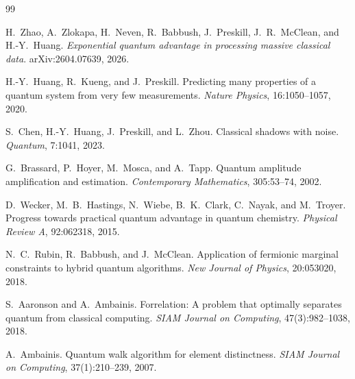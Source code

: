 \documentclass[11pt]{article}
\begin{document}

\begin{thebibliography}{99}

 H.\ Zhao, A.\ Zlokapa, H.\ Neven, R.\ Babbush, J.\ Preskill, J.\ R.\ McClean, and H.-Y.\ Huang. \emph{Exponential quantum advantage in processing massive classical data}. arXiv:2604.07639, 2026.

 H.-Y.\ Huang, R.\ Kueng, and J.\ Preskill. Predicting many properties of a quantum system from very few measurements. \emph{Nature Physics}, 16:1050--1057, 2020.

 S.\ Chen, H.-Y.\ Huang, J.\ Preskill, and L.\ Zhou. Classical shadows with noise. \emph{Quantum}, 7:1041, 2023.

 G.\ Brassard, P.\ Hoyer, M.\ Mosca, and A.\ Tapp. Quantum amplitude amplification and estimation. \emph{Contemporary Mathematics}, 305:53--74, 2002.

 D.\ Wecker, M.\ B.\ Hastings, N.\ Wiebe, B.\ K.\ Clark, C.\ Nayak, and M.\ Troyer. Progress towards practical quantum advantage in quantum chemistry. \emph{Physical Review A}, 92:062318, 2015.

 N.\ C.\ Rubin, R.\ Babbush, and J.\ McClean. Application of fermionic marginal constraints to hybrid quantum algorithms. \emph{New Journal of Physics}, 20:053020, 2018.

 S.\ Aaronson and A.\ Ambainis. Forrelation: A problem that optimally separates quantum from classical computing. \emph{SIAM Journal on Computing}, 47(3):982--1038, 2018.

 A.\ Ambainis. Quantum walk algorithm for element distinctness. \emph{SIAM Journal on Computing}, 37(1):210--239, 2007.

\end{thebibliography}
\end{document}
